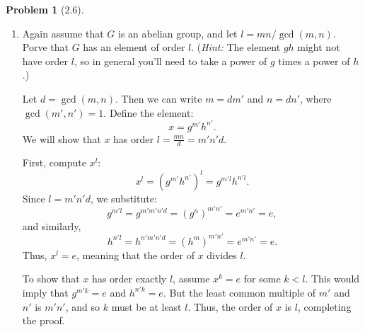 \documentclass[12pt]{article}
\theoremstyle{definition}
\newtheorem{problem}{Problem}
\begin{document}
\begin{problem}[2.6]
\begin{enumerate}[label=(\alph*)]
\begin{solution}
        \end{solution}
        \item Again assume that $G$ is an abelian group, and let $l = mn/\gcd(m, n)$. Porve that $G$ has an element of order $l$. (\textit{Hint:} The element
              $gh$ might not have order $l$, so in general you'll need to take a power of $g$ times a power of $h$.) 

        \begin{solution}
            Let $d = \gcd(m, n)$. Then we can write $m = d m'$ and $n = d n'$, where $\gcd(m', n') = 1$. Define the element:
            \[
                x = g^{m'} h^{n'}.
            \]
            We will show that $x$ has order $l = \frac{mn}{d} = m' n' d$.
            
            First, compute $x^l$:
            \[
                x^l = (g^{m'} h^{n'})^l = g^{m' l} h^{n' l}.
            \]
            Since $l = m' n' d$, we substitute:
            \[
                g^{m' l} = g^{m' m' n' d} = (g^n)^{m' n'} = e^{m' n'} = e,
            \]
            and similarly,
            \[
                h^{n' l} = h^{n' m' n' d} = (h^m)^{m' n'} = e^{m' n'} = e.
            \]
            Thus, $x^l = e$, meaning that the order of $x$ divides $l$.
            
            To show that $x$ has order exactly $l$, assume $x^k = e$ for some $k < l$. This would imply that $g^{m' k} = e$ and $h^{n' k} = e$. But the least common multiple of $m'$ and $n'$ is $m' n'$, and so $k$ must be at least $l$. Thus, the order of $x$ is $l$, completing the proof.
        \end{solution}
    \end{enumerate}
\end{problem}
\end{document}
